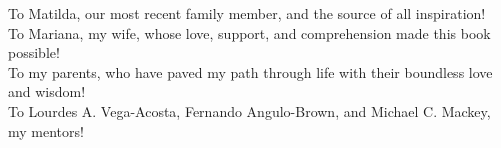 
%
%
%

\begin{dedication}
To Matilda, our most recent family member, and the source of all inspiration!
\\[1cm]
\noindent
To Mariana, my wife, whose love, support, and comprehension made this book possible!
\\[1cm]
\noindent
To my parents, who have paved my path through life with their boundless love and wisdom!
\\[1cm]
\noindent
To Lourdes A. Vega-Acosta, Fernando Angulo-Brown, and Michael C. Mackey, my mentors!
\end{dedication}




